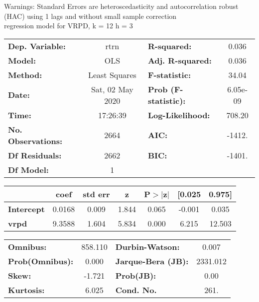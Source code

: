 Warnings: \newline
 [1] Standard Errors are heteroscedasticity and autocorrelation robust (HAC) using 1 lags and without small sample correction\\ 

regression model for VRPD, k = 12 h = 3\begin{center}
\begin{tabular}{lclc}
\toprule
\textbf{Dep. Variable:}    &       rtrn       & \textbf{  R-squared:         } &     0.036   \\
\textbf{Model:}            &       OLS        & \textbf{  Adj. R-squared:    } &     0.036   \\
\textbf{Method:}           &  Least Squares   & \textbf{  F-statistic:       } &     34.04   \\
\textbf{Date:}             & Sat, 02 May 2020 & \textbf{  Prob (F-statistic):} &  6.05e-09   \\
\textbf{Time:}             &     17:26:39     & \textbf{  Log-Likelihood:    } &    708.20   \\
\textbf{No. Observations:} &        2664      & \textbf{  AIC:               } &    -1412.   \\
\textbf{Df Residuals:}     &        2662      & \textbf{  BIC:               } &    -1401.   \\
\textbf{Df Model:}         &           1      & \textbf{                     } &             \\
\bottomrule
\end{tabular}
\begin{tabular}{lcccccc}
                   & \textbf{coef} & \textbf{std err} & \textbf{z} & \textbf{P$> |$z$|$} & \textbf{[0.025} & \textbf{0.975]}  \\
\midrule
\textbf{Intercept} &       0.0168  &        0.009     &     1.844  &         0.065        &       -0.001    &        0.035     \\
\textbf{vrpd}      &       9.3588  &        1.604     &     5.834  &         0.000        &        6.215    &       12.503     \\
\bottomrule
\end{tabular}
\begin{tabular}{lclc}
\textbf{Omnibus:}       & 858.110 & \textbf{  Durbin-Watson:     } &    0.007  \\
\textbf{Prob(Omnibus):} &   0.000 & \textbf{  Jarque-Bera (JB):  } & 2331.012  \\
\textbf{Skew:}          &  -1.721 & \textbf{  Prob(JB):          } &     0.00  \\
\textbf{Kurtosis:}      &   6.025 & \textbf{  Cond. No.          } &     261.  \\
\bottomrule
\end{tabular}
\end{center}

